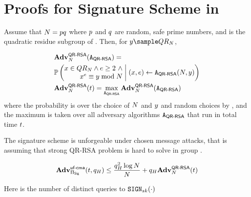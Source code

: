 

\section{Proofs for Signature Scheme in }
\label{sec:proof:sig_scheme}

\begin{definition}
	Assume that $\rsaMod = \safePrime[1] \safePrime[2]$ where
        $\safePrime[1]$ and $\safePrime[2]$ are random, safe prime
        numbers, and \qrGroup is the quadratic residue subgroup of
        \integersModNInv. Then, for $\genericFnOutput \getsr
        \qrGroup$,
	
	\begin{align*}
	  & \Advantage{\rsaLabel}{\rsaMod}(\rsaAdversary) = \\
          & \cprob{\bigg}{\begin{array}{@{}r@{}}
              \genericFnInput \in \qrGroup \land
              \rsaExponent \ge 2~\land \\
              \genericFnInput^{\rsaExponent} \equiv \genericFnOutput 
	      \bmod \rsaMod
          \end{array}}{\begin{array}[m]{@{}l@{}}
              (\genericFnInput, \rsaExponent)
              \gets \rsaAdversary(\rsaMod, \genericFnOutput)
          \end{array}} \\
	  & \rsaAdv = \max_{\rsaAdversary} 
	 \Advantage{\rsaLabel}{\rsaMod}(\rsaAdversary) 
	\end{align*}
	\noindent
	where the probability is over the choice of $N$ and
        $\genericFnOutput$ and random choices by \rsaAdversary, and
        the maximum is taken over all adversary algorithms
        $\rsaAdversary$ that run in total time $t$.
\end{definition}



 
\begin{theorem}
	\label{thm:unforge}
	The signature scheme \sigScheme is unforgeable under chosen message attacks, that is assuming that 
	strong QR-RSA problem is hard to solve in group \qrGroup. 		

	\[
	\mathbf{Adv}^{\scriptsize\textsf{uf-cma}}_{\Pi_{\mathsf{Sig}} }(t, q_H) \le \frac{q_H^2 \log N}{N} + q_H \mathbf{Adv}^{\textsf{QR-RSA}}_{N}(t) 
	\]
	
        Here \oracleQueries is the number of distinct queries to $\signingAlg[\privKey](\cdot)$
	
\end{theorem}

